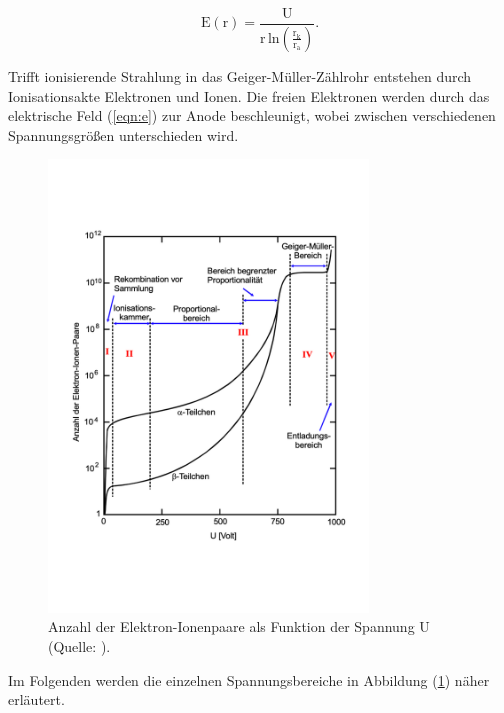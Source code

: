 \begin{equation}
\text{E}(\text{r}) = \frac{\text{U}}{\text{r} \, \text{ln}(\frac{\text{r}_\text{k}}{\text{r}_\text{a}})}.
\label{eqn:e}
\end{equation}

\noindent
Trifft ionisierende Strahlung in das Geiger-Müller-Zählrohr entstehen durch Ionisationsakte Elektronen und Ionen.
Die freien Elektronen werden durch das elektrische Feld (\ref{eqn:e}) zur Anode beschleunigt, wobei zwischen verschiedenen Spannungsgrößen unterschieden wird.

\newpage
\begin{figure}
            \centering
               \includegraphics[height=12cm]{u.pdf}
               \caption{Anzahl der Elektron-Ionenpaare als Funktion der Spannung U (Quelle: \cite{V703}).}
               \label{fig:u}
        \end{figure}

\noindent
Im Folgenden werden die einzelnen Spannungsbereiche in Abbildung (\ref{fig:u}) näher erläutert.

